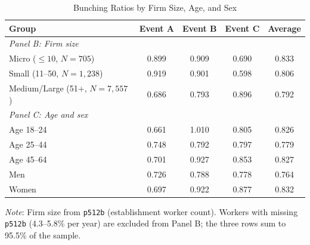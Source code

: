 \documentclass[12pt]{article}
\begin{document}
\begin{appendices}
\begin{table}[H]
\centering
\caption{Bunching Ratios by Firm Size, Age, and Sex}
\label{tab:hetero_firm}
\begin{threeparttable}
\small
\begin{tabular}{lcccc}
\toprule
Group & Event A & Event B & Event C & Average \\
\midrule
\multicolumn{5}{l}{\textit{Panel B: Firm size}} \\
Micro ($\leq 10$, $N = 705$) & 0.899 & 0.909 & 0.690 & 0.833 \\
Small (11--50, $N = 1{,}238$) & 0.919 & 0.901 & 0.598 & 0.806 \\
Medium/Large (51+, $N = 7{,}557$) & 0.686 & 0.793 & 0.896 & 0.792 \\[6pt]
\multicolumn{5}{l}{\textit{Panel C: Age and sex}} \\
Age 18--24 & 0.661 & 1.010 & 0.805 & 0.826 \\
Age 25--44 & 0.748 & 0.792 & 0.797 & 0.779 \\
Age 45--64 & 0.701 & 0.927 & 0.853 & 0.827 \\
Men & 0.726 & 0.788 & 0.778 & 0.764 \\
Women & 0.697 & 0.922 & 0.877 & 0.832 \\
\bottomrule
\end{tabular}
\begin{tablenotes}
\small
\item \textit{Note}: Firm size from \texttt{p512b} (establishment worker count). Workers with missing \texttt{p512b} (4.3--5.8\% per year) are excluded from Panel B; the three rows sum to 95.5\% of the sample.
\end{tablenotes}
\end{threeparttable}
\end{table}


\end{appendices}
\end{document}
